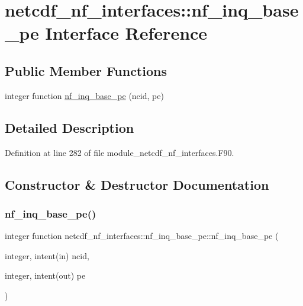 \hypertarget{interfacenetcdf__nf__interfaces_1_1nf__inq__base__pe}{}\section{netcdf\+\_\+nf\+\_\+interfaces\+:\+:nf\+\_\+inq\+\_\+base\+\_\+pe Interface Reference}
\label{interfacenetcdf__nf__interfaces_1_1nf__inq__base__pe}
\subsection*{Public Member Functions}
\begin{DoxyCompactItemize}
\item 
integer function \hyperlink{interfacenetcdf__nf__interfaces_1_1nf__inq__base__pe_a86c4938b407e55334a9a55ad9d7c3a32}{nf\+\_\+inq\+\_\+base\+\_\+pe} (ncid, pe)
\end{DoxyCompactItemize}


\subsection{Detailed Description}


Definition at line 282 of file module\+\_\+netcdf\+\_\+nf\+\_\+interfaces.\+F90.



\subsection{Constructor \& Destructor Documentation}
\mbox{\label{interfacenetcdf__nf__interfaces_1_1nf__inq__base__pe_a86c4938b407e55334a9a55ad9d7c3a32}} 
\subsubsection{\texorpdfstring{nf\+\_\+inq\+\_\+base\+\_\+pe()}{nf\_inq\_base\_pe()}}
{\footnotesize\ttfamily integer function netcdf\+\_\+nf\+\_\+interfaces\+::nf\+\_\+inq\+\_\+base\+\_\+pe\+::nf\+\_\+inq\+\_\+base\+\_\+pe (\begin{DoxyParamCaption}\item[{integer, intent(in)}]{ncid,  }\item[{integer, intent(out)}]{pe }\end{DoxyParamCaption})}



